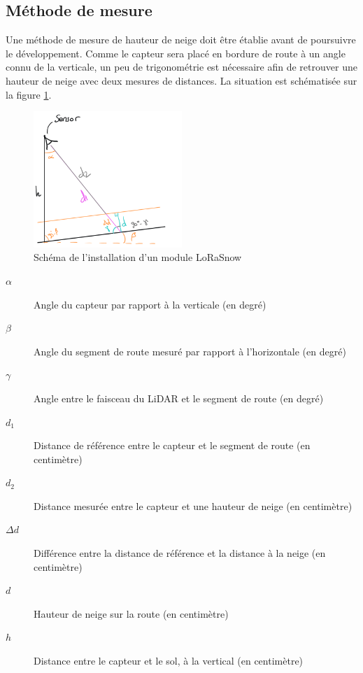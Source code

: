 \subsection{Méthode de mesure}
\label{sec:MethodeDeMesure}

Une méthode de mesure de hauteur de neige doit être établie avant de poursuivre le développement. Comme
le capteur sera placé en bordure de route à un angle connu de la verticale, un peu de trigonométrie est
nécessaire afin de retrouver une hauteur de neige avec deux mesures de distances. La situation est
schématisée sur la figure \ref{fig:LiDARMesMethod}.

\begin{figure}[H]
    \centering
    \includegraphics[width=0.5\textwidth]{Images/LiDAR/LiDAR_MesMethod.png}
    \caption{Schéma de l'installation d'un module LoRaSnow}
    \label{fig:LiDARMesMethod}
\end{figure}

\begin{description}
    \item[$\alpha$] Angle du capteur par rapport à la verticale (en degré)
    \item[$\beta$] Angle du segment de route mesuré par rapport à l'horizontale (en degré)
    \item[$\gamma$] Angle entre le faisceau du LiDAR et le segment de route (en degré) 
    \item[$d_1$] Distance de référence entre le capteur et le segment de route (en centimètre)
    \item[$d_2$] Distance mesurée entre le capteur et une hauteur de neige (en centimètre)
    \item[$\Delta d$] Différence entre la distance de référence et la distance à la neige (en centimètre) 
    \item[$d$] Hauteur de neige sur la route (en centimètre) 
    \item[$h$] Distance entre le capteur et le sol, à la vertical (en centimètre)
\end{description}

